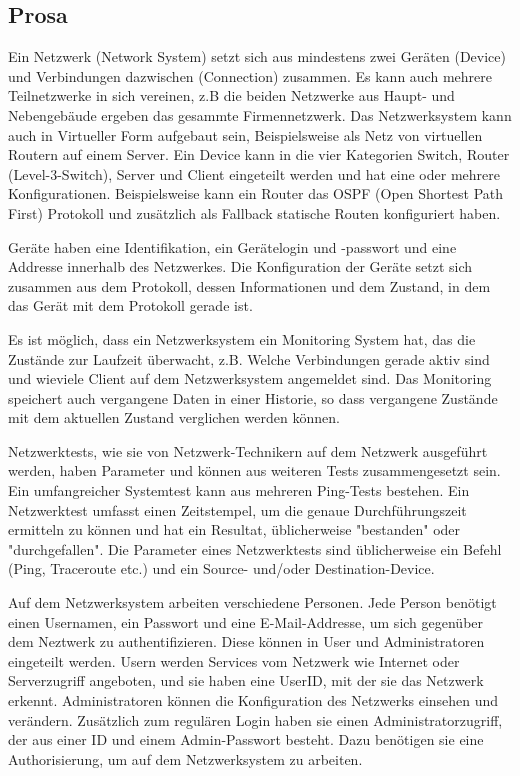 \documentclass[
	ngerman,
	toc=listof, %
	toc=bibliography, %
	footnotes=multiple, %
	parskip=half, %
	numbers=noendperiod %
]{scrartcl}
\begin{document}
	\subsection{Prosa}
	Ein Netzwerk (Network System) setzt sich aus mindestens zwei Geräten (Device) und Verbindungen dazwischen (Connection) zusammen.
	Es kann auch mehrere Teilnetzwerke in sich vereinen, z.B die beiden Netzwerke aus Haupt- und Nebengebäude ergeben das gesammte Firmennetzwerk.
	Das Netzwerksystem kann auch in Virtueller Form aufgebaut sein, Beispielsweise als Netz von virtuellen Routern auf einem Server.
	Ein Device kann in die vier Kategorien Switch, Router (Level-3-Switch), Server und Client eingeteilt werden und hat eine oder mehrere Konfigurationen.
	Beispielsweise kann ein Router das OSPF (Open Shortest Path First) Protokoll und zusätzlich als Fallback statische Routen konfiguriert haben.

	Geräte haben eine Identifikation, ein Gerätelogin und -passwort und eine Addresse innerhalb des Netzwerkes.
	Die Konfiguration der Geräte setzt sich zusammen aus dem Protokoll, dessen Informationen und dem Zustand, in dem das Gerät mit dem Protokoll gerade ist.

	Es ist möglich, dass ein Netzwerksystem ein Monitoring System hat, das die Zustände zur Laufzeit überwacht, z.B. Welche Verbindungen gerade aktiv sind und wieviele Client auf dem Netzwerksystem angemeldet sind.
	Das Monitoring speichert auch vergangene Daten in einer Historie, so dass vergangene Zustände mit dem aktuellen Zustand verglichen werden können.

	Netzwerktests, wie sie von Netzwerk-Technikern auf dem Netzwerk ausgeführt werden, haben Parameter und können aus weiteren Tests zusammengesetzt sein. 
	Ein umfangreicher Systemtest kann aus mehreren Ping-Tests bestehen.
	Ein Netzwerktest umfasst einen Zeitstempel, um die genaue Durchführungszeit ermitteln zu können und hat ein Resultat, üblicherweise "bestanden" oder "durchgefallen".
	Die Parameter eines Netzwerktests sind üblicherweise ein Befehl (Ping, Traceroute etc.) und ein Source- und/oder Destination-Device.

	Auf dem Netzwerksystem arbeiten verschiedene Personen. 
	Jede Person benötigt einen Usernamen, ein Passwort und eine E-Mail-Addresse, um sich gegenüber dem Neztwerk zu authentifizieren.
	Diese können in User und Administratoren eingeteilt werden. 
	Usern werden Services vom Netzwerk wie Internet oder Serverzugriff angeboten, und sie haben eine UserID, mit der sie das Netzwerk erkennt.
	Administratoren können die Konfiguration des Netzwerks einsehen und verändern. 
	Zusätzlich zum regulären Login haben sie einen Administratorzugriff, der aus einer ID und einem Admin-Passwort besteht.
	Dazu benötigen sie eine Authorisierung, um auf dem Netzwerksystem zu arbeiten.
\end{document}
